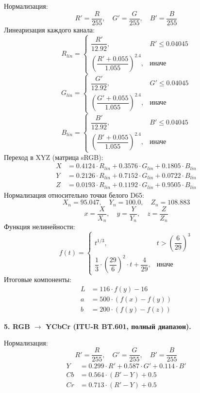 \documentclass[12pt,a4paper]{article}
\begin{document}
Нормализация:
\[
R' = \frac{R}{255},\quad G' = \frac{G}{255},\quad B' = \frac{B}{255}
\]
Линеаризация каждого канала:
\[
R_{lin} = \begin{cases} \dfrac{R'}{12.92}, & R' \le 0.04045 \\[8pt] \left( \dfrac{R' + 0.055}{1.055} \right)^{2.4}, & \text{иначе} \end{cases}
\]
\[
G_{lin} = \begin{cases} \dfrac{G'}{12.92}, & G' \le 0.04045 \\[8pt] \left( \dfrac{G' + 0.055}{1.055} \right)^{2.4}, & \text{иначе} \end{cases}
\]
\[
B_{lin} = \begin{cases} \dfrac{B'}{12.92}, & B' \le 0.04045 \\[8pt] \left( \dfrac{B' + 0.055}{1.055} \right)^{2.4}, & \text{иначе} \end{cases}
\]
Переход в XYZ (матрица sRGB):
\begin{align*}
X &= 0.4124 \cdot R_{lin} + 0.3576 \cdot G_{lin} + 0.1805 \cdot B_{lin} \\
Y &= 0.2126 \cdot R_{lin} + 0.7152 \cdot G_{lin} + 0.0722 \cdot B_{lin} \\
Z &= 0.0193 \cdot R_{lin} + 0.1192 \cdot G_{lin} + 0.9505 \cdot B_{lin}
\end{align*}
Нормализация относительно точки белого D65:
\[
X_n = 95.047,\quad Y_n = 100.0,\quad Z_n = 108.883
\]
\[
x = \frac{X}{X_n},\quad y = \frac{Y}{Y_n},\quad z = \frac{Z}{Z_n}
\]
Функция нелинейности:
\[
f(t) = \begin{cases}
t^{1/3}, & t > \left(\dfrac{6}{29}\right)^3 \\[8pt]
\dfrac{1}{3} \cdot \left(\dfrac{29}{6}\right)^2 \cdot t + \dfrac{4}{29}, & \text{иначе}
\end{cases}
\]
Итоговые компоненты:
\begin{align*}
L &= 116 \cdot f(y) - 16 \\
a &= 500 \cdot (f(x) - f(y)) \\
b &= 200 \cdot (f(y) - f(z))
\end{align*}

\textbf{5. RGB \(\to\) YCbCr (ITU-R BT.601, полный диапазон).}

Нормализация:
\[
R' = \frac{R}{255},\quad G' = \frac{G}{255},\quad B' = \frac{B}{255}
\]
\begin{align*}
Y &= 0.299 \cdot R' + 0.587 \cdot G' + 0.114 \cdot B' \\
Cb &= 0.564 \cdot (B' - Y) + 0.5 \\
Cr &= 0.713 \cdot (R' - Y) + 0.5
\end{align*}
\end{document}
